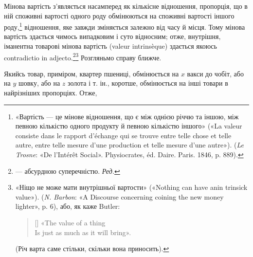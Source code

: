 Мінова вартість з’являється насамперед як кількісне відношення,
пропорція, що в ній споживні вартості одного роду обмінюються
на споживні вартості іншого роду,\footnote{
«Вартість — це мінове відношення, що є між однією річчю та іншою,
між певною кількістю одного продукту й певною кількістю іншого»
(«La valeur consiste dans le rapport d’échange qui se trouve entre telle
chose et telle autre, entre telle mesure d’une production et telle mesure
d’une autre»). (\emph{Le Trosne}: «De l’Intérêt Social». Physiocrates, éd. Daire.
Paris. 1846, p. 889).
} відношення, яке
завжди зміняється залежно від часу й місця. Тому мінова вартість
здається чимось випадковим і суто відносним; отже, внутрішня,
іманентна товарові мінова вартість (valeur intrinsèque) здається
якоюсь contradictio in adjecto.\footnote*{
— абсурдною суперечністю. \emph{Ред.}
}\footnote{
«Ніщо не може мати внутрішньої вартости» («Nothing can have
anin trinsick value»). (\emph{N. Barbon}: «A Discourse concerning coining the new
money lighter», p. 6), або, як каже Butler:
\settowidth{\versewidth}{Is just as much as it will bring».}
\begin{verse}[\versewidth]
«The value of a thing \\
Is just as much as it will bring».
\end{verse}
(Річ варта саме стільки, скільки вона приносить).
} Розгляньмо справу ближче.

Якийсь товар, приміром, квартер пшениці, обмінюється на $x$
вакси до чобіт, або на $y$ шовку, або на $z$ золота і т. ін., коротше,
обмінюється на інші товари в найрізніших пропорціях. Отже,
\parbreak{}  %
